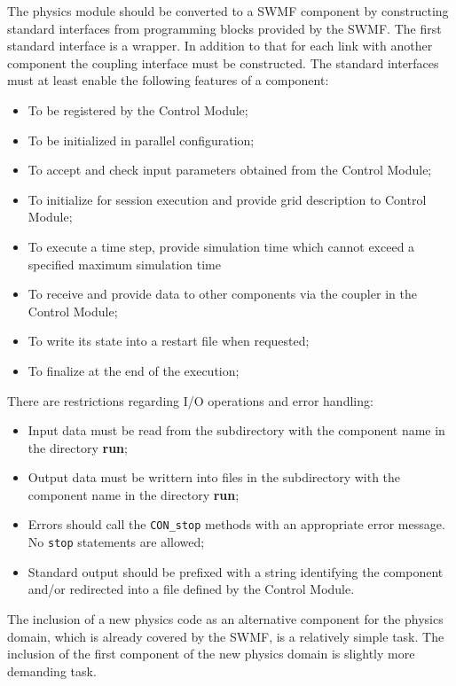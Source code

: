 The physics module should be converted to a SWMF component by constructing 
standard interfaces from programming blocks provided by the SWMF.
The first standard interface is a wrapper. 
In addition to that for each link with another component
the coupling interface must be constructed.
The standard interfaces must at least enable the following 
features of a component:
\begin{itemize}
\item To be registered by the Control Module;
\item To be initialized in parallel configuration;
\item To accept and check input parameters obtained from the Control Module;
\item To initialize for session execution and provide grid description to 
      Control Module;
\item To execute a time step, provide simulation time which cannot exceed
      a specified maximum simulation time
\item To receive and provide data to other components via the coupler in 
      the Control Module;
\item To write its state into a restart file when requested;
\item To finalize at the end of the execution;
\end{itemize}
There are restrictions regarding I/O operations and error handling:
\begin{itemize}
\item Input data must be read from the subdirectory with the component name
      in the directory \textbf{run};
\item Output data must be writtern into files in the subdirectory 
      with the component name in the directory \textbf{run};
\item Errors should call the {\tt CON\_stop} methods with an appropriate
      error message. No {\tt stop} statements are allowed;
\item Standard output should be prefixed with a string identifying the
      component and/or redirected into a file defined by the 
      Control Module.
\end{itemize}

The inclusion of a new physics code as  an alternative component 
for the physics domain, which is already covered by the SWMF, 
is a relatively simple task. The inclusion of the first component of 
the new physics domain is slightly more demanding task.

